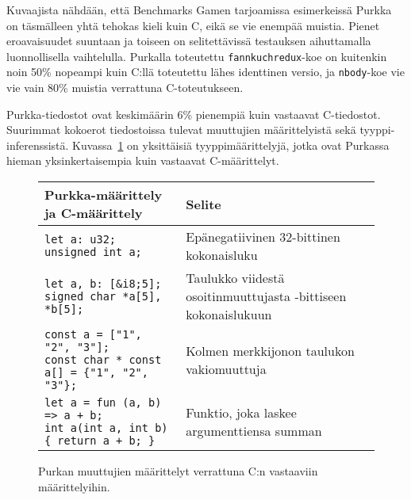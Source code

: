 Kuvaajista nähdään, että Benchmarks Gamen tarjoamissa esimerkeissä Purkka on
täsmälleen yhtä tehokas kieli kuin C, eikä se vie enempää muistia. Pienet
eroavaisuudet suuntaan ja toiseen on selitettävissä testauksen aihuttamalla
luonnollisella vaihtelulla. Purkalla toteutettu \texttt{fannkuchredux}-koe on
kuitenkin noin 50\% nopeampi kuin C:llä toteutettu lähes identtinen versio, ja
\texttt{nbody}-koe vie vie vain 80\% muistia verrattuna C-toteutukseen.

Purkka-tiedostot ovat keskimäärin 6\% pienempiä kuin vastaavat C-tiedostot.
Suurimmat kokoerot tiedostoissa tulevat muuttujien määrittelyistä sekä
tyyppi\hyp{}inferenssistä. Kuvassa~\ref{fig:declarations} on yksittäisiä
tyyppimäärittelyjä, jotka ovat Purkassa hieman yksinkertaisempia kuin vastaavat
C-määrittelyt.

\begin{figure}[ht!]
    \begin{adjustbox}{center}
        \begin{tabular}{@{} m{} m{} @{}} \toprule
            Purkka-määrittely ja C-määrittely & Selite \\ \midrule

            \texttt{let a: u32; \newline unsigned int a;} & Epänegatiivinen 32-bittinen kokonaisluku \\
            \noalign{\vspace{0.3cm}}

            \texttt{let a, b: [\&i8;5]; \newline signed char *a[5], *b[5];} & Taulukko viidestä osoitinmuuttujasta \newline 8-bittiseen kokonaislukuun \\
            \noalign{\vspace{0.3cm}}

            \texttt{const a = ["1", "2", "3"]; \newline const char * const a[] = \{"1", "2", "3"\};} & Kolmen merkkijonon taulukon vakiomuuttuja \\
            \noalign{\vspace{0.3cm}}

            \texttt{let a = fun (a, b) => a + b; \newline int a(int a, int b) \{ return a + b; \}} & Funktio, joka laskee argumenttiensa summan \\ \bottomrule
        \end{tabular}
    \end{adjustbox}
    \label{fig:declarations}
    \caption{Purkan muuttujien määrittelyt verrattuna C:n vastaaviin
    määrittelyihin.}
\end{figure}

